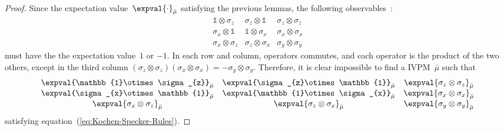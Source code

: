 \documentclass[12pt]{iopart}
\theoremstyle{plain}
\theoremstyle{definition}
\theoremstyle{remark}
\begin{document}
\begin{proof}Since the expectation value~$\expval{\cdot}_{\bar{\mu}}$
satisfying the previous lemmas, the following observables~\cite{Mermin1990Simple,peres1995quantum}:
\begin{equation}
\begin{array}{ccc}
\mathbb{1}\otimes\sigma_{z} & \sigma_{z}\otimes\mathbb{1} & \sigma_{z}\otimes\sigma_{z}\\
\sigma_{x}\otimes\mathbb{1} & \mathbb{1}\otimes\sigma_{x} & \sigma_{x}\otimes\sigma_{x}\\
\sigma_{x}\otimes\sigma_{z} & \sigma_{z}\otimes\sigma_{x} & \sigma_{y}\otimes\sigma_{y}
\end{array}\label{eq:MerminSquare}
\end{equation}
must have the the expectation value~$1$ or $-1$. In each row and
column, operators commutes, and each operator is the product of the
two others, except in the third column $\left(\sigma_{z}\otimes\sigma_{z}\right)\left(\sigma_{x}\otimes\sigma_{x}\right)=-\sigma_{y}\otimes\sigma_{y}$.
Therefore, it is clear impossible to find a IVPM~$\bar{\mu}$ such
that 
\begin{equation}
\begin{array}{ccc}
\expval{\mathbb{1}\otimes\sigma_{z}}_{\bar{\mu}} & \expval{\sigma_{z}\otimes\mathbb{1}}_{\bar{\mu}} & \expval{\sigma_{z}\otimes\sigma_{z}}_{\bar{\mu}}\\
\expval{\sigma_{x}\otimes\mathbb{1}}_{\bar{\mu}} & \expval{\mathbb{1}\otimes\sigma_{x}}_{\bar{\mu}} & \expval{\sigma_{x}\otimes\sigma_{x}}_{\bar{\mu}}\\
\expval{\sigma_{x}\otimes\sigma_{z}}_{\bar{\mu}} & \expval{\sigma_{z}\otimes\sigma_{x}}_{\bar{\mu}} & \expval{\sigma_{y}\otimes\sigma_{y}}_{\bar{\mu}}
\end{array}\label{eq:MerminSquare-values}
\end{equation}
satisfying equation~(\ref{eq:Kochen-Specker-Rules}).\end{proof}

\printbibliography
\end{document}
